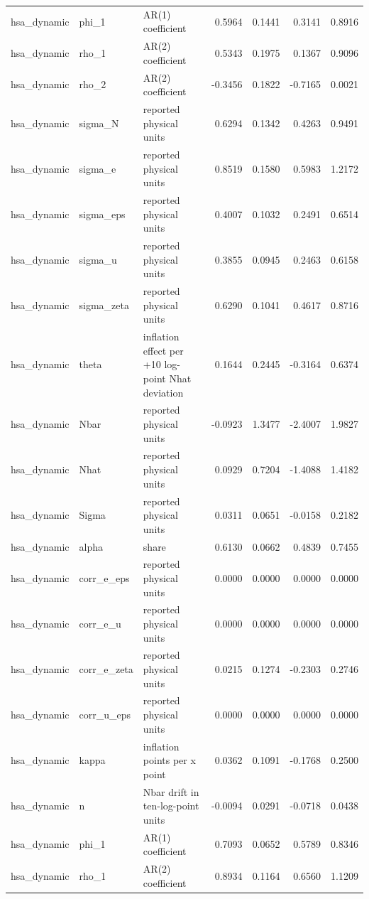 \begin{tabular}{lllrrrr}
hsa\_dynamic & phi\_1 & AR(1) coefficient & 0.5964 & 0.1441 & 0.3141 & 0.8916 \\
hsa\_dynamic & rho\_1 & AR(2) coefficient & 0.5343 & 0.1975 & 0.1367 & 0.9096 \\
hsa\_dynamic & rho\_2 & AR(2) coefficient & -0.3456 & 0.1822 & -0.7165 & 0.0021 \\
hsa\_dynamic & sigma\_N & reported physical units & 0.6294 & 0.1342 & 0.4263 & 0.9491 \\
hsa\_dynamic & sigma\_e & reported physical units & 0.8519 & 0.1580 & 0.5983 & 1.2172 \\
hsa\_dynamic & sigma\_eps & reported physical units & 0.4007 & 0.1032 & 0.2491 & 0.6514 \\
hsa\_dynamic & sigma\_u & reported physical units & 0.3855 & 0.0945 & 0.2463 & 0.6158 \\
hsa\_dynamic & sigma\_zeta & reported physical units & 0.6290 & 0.1041 & 0.4617 & 0.8716 \\
hsa\_dynamic & theta & inflation effect per +10 log-point Nhat deviation & 0.1644 & 0.2445 & -0.3164 & 0.6374 \\
hsa\_dynamic & Nbar & reported physical units & -0.0923 & 1.3477 & -2.4007 & 1.9827 \\
hsa\_dynamic & Nhat & reported physical units & 0.0929 & 0.7204 & -1.4088 & 1.4182 \\
hsa\_dynamic & Sigma & reported physical units & 0.0311 & 0.0651 & -0.0158 & 0.2182 \\
hsa\_dynamic & alpha & share & 0.6130 & 0.0662 & 0.4839 & 0.7455 \\
hsa\_dynamic & corr\_e\_eps & reported physical units & 0.0000 & 0.0000 & 0.0000 & 0.0000 \\
hsa\_dynamic & corr\_e\_u & reported physical units & 0.0000 & 0.0000 & 0.0000 & 0.0000 \\
hsa\_dynamic & corr\_e\_zeta & reported physical units & 0.0215 & 0.1274 & -0.2303 & 0.2746 \\
hsa\_dynamic & corr\_u\_eps & reported physical units & 0.0000 & 0.0000 & 0.0000 & 0.0000 \\
hsa\_dynamic & kappa & inflation points per x point & 0.0362 & 0.1091 & -0.1768 & 0.2500 \\
hsa\_dynamic & n & Nbar drift in ten-log-point units & -0.0094 & 0.0291 & -0.0718 & 0.0438 \\
hsa\_dynamic & phi\_1 & AR(1) coefficient & 0.7093 & 0.0652 & 0.5789 & 0.8346 \\
hsa\_dynamic & rho\_1 & AR(2) coefficient & 0.8934 & 0.1164 & 0.6560 & 1.1209 \\

\end{tabular}
